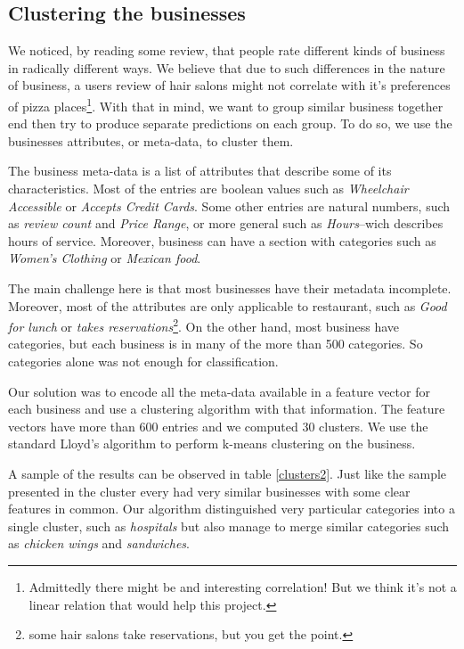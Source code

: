 \documentclass[12pt]{article}
\begin{document}
\begin{multicols}{2}
\section{Clustering the businesses}
We noticed, by reading some review, that people rate different kinds of business in radically different ways. %
We believe that due to such differences in the nature of business, a users review of hair salons might not correlate with it's preferences of pizza places\footnote{Admittedly there might be and interesting correlation! But we think it's not a linear relation that would help this project.}.
With that in mind, we want to group similar business together end then try to produce separate predictions on each group. To do so, we use the businesses attributes, or meta-data, to cluster them.

The business meta-data is a list of attributes that describe some of its characteristics. Most of the entries are boolean values such as \emph{Wheelchair Accessible} or \emph{Accepts Credit Cards}. Some other entries are natural numbers, such as \emph{review count} and \emph{Price Range}, or more general such as \emph{Hours}--wich describes hours of service. Moreover, business can have a section with categories such as \emph{Women's Clothing} or \emph{Mexican food}.

The main challenge here is that most businesses have their metadata incomplete. Moreover, most of the attributes are only applicable to restaurant, such as \emph{Good for lunch} or \emph{takes reservations}\footnote{some hair salons take reservations, but you get the point.}. On the other hand, most business have categories, but each business is in many of the more than 500 categories. So categories alone was not enough for classification. 

Our solution was to encode all the meta-data available in a feature vector for each business and use a clustering algorithm with that information. The feature vectors have more than 600 entries and we computed 30 clusters. We use the standard Lloyd's algorithm to perform k-means clustering on the business.  

A sample of the results can be observed in table \ref{clusters2}. Just like the sample presented in the cluster every had very similar businesses with some clear features in common. Our algorithm distinguished very particular categories into a single cluster, such as \emph{hospitals} but also manage to merge similar categories such as \emph{chicken wings} and \emph{sandwiches}.



\end{multicols}
\end{document}
